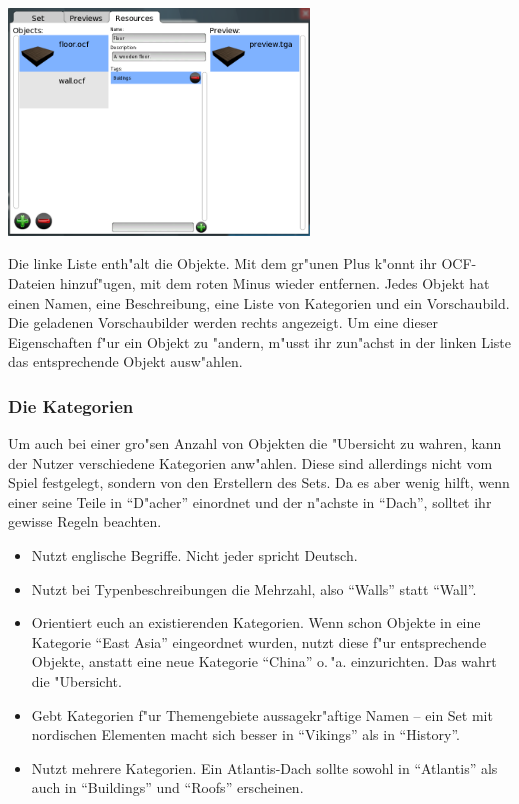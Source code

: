 \documentclass[a4paper]{article}
\begin{document}
\begin{center}
\includegraphics[width=80mm]{../images/setcreator/resources.png}
\end{center}

Die linke Liste enth"alt die Objekte. Mit dem gr"unen Plus k"onnt ihr OCF-Dateien hinzuf"ugen, mit dem roten Minus wieder entfernen. Jedes Objekt hat
einen Namen, eine Beschreibung, eine Liste von Kategorien und ein Vorschaubild. Die geladenen Vorschaubilder werden rechts angezeigt. Um eine dieser
Eigenschaften f"ur ein Objekt zu "andern, m"usst ihr zun"achst in der linken Liste das entsprechende Objekt ausw"ahlen.

\subsubsection{Die Kategorien}
Um auch bei einer gro"sen Anzahl von Objekten die "Ubersicht zu wahren, kann der Nutzer verschiedene Kategorien anw"ahlen. Diese sind allerdings nicht
vom Spiel festgelegt, sondern von den Erstellern des Sets. Da es aber wenig hilft, wenn einer seine Teile in "`D"acher"' einordnet und der n"achste in
"`Dach"', solltet ihr gewisse Regeln beachten.

\begin{itemize}
\item Nutzt englische Begriffe. Nicht jeder spricht Deutsch.
\item Nutzt bei Typenbeschreibungen die Mehrzahl, also "`Walls"' statt "`Wall"'.
\item Orientiert euch an existierenden Kategorien. Wenn schon Objekte in eine Kategorie "`East Asia"' eingeordnet wurden, nutzt diese f"ur entsprechende
  Objekte, anstatt eine neue Kategorie "`China"' o.\,"a. einzurichten. Das wahrt die "Ubersicht.
\item Gebt Kategorien f"ur Themengebiete aussagekr"aftige Namen -- ein Set mit nordischen Elementen macht sich besser in "`Vikings"' als in "`History"'.
\item Nutzt mehrere Kategorien. Ein Atlantis-Dach sollte sowohl in "`Atlantis"' als auch in "`Buildings"' und "`Roofs"' erscheinen.
\end{itemize}
\end{document}
